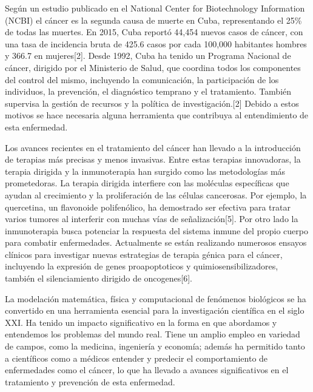\hspace{.1cm}Según un estudio publicado en el National Center for Biotechnology Information (NCBI) el cáncer es la segunda causa de muerte en Cuba, representando el 25\% de todas las muertes. En 2015, Cuba reportó 44,454 nuevos casos de cáncer, con una tasa de incidencia bruta de 425.6 casos por cada 100,000 habitantes hombres y 366.7 en mujeres[2]. Desde 1992, Cuba ha tenido un Programa Nacional de cáncer, dirigido por el Ministerio de Salud, que coordina todos los componentes del control del mismo, incluyendo la comunicación, la participación de los individuos, la prevención, el diagnóstico temprano y el tratamiento. También supervisa la gestión de recursos y la política de investigación.[2] Debido a estos motivos se hace necesaria alguna herramienta que contribuya al entendimiento de esta enfermedad.

\hspace{.1cm}Los avances recientes en el tratamiento del cáncer han llevado a la introducción de terapias más precisas y menos invasivas. Entre estas terapias innovadoras, la terapia dirigida y la inmunoterapia han surgido como las metodologías más prometedoras. La terapia dirigida interfiere con las moléculas específicas que ayudan al crecimiento y la proliferación de las células cancerosas. Por ejemplo, la quercetina, un flavonoide polifen\'olico, ha demostrado ser efectiva para tratar varios tumores al interferir con muchas vías de señalización[5]. Por otro lado la inmunoterapia busca potenciar la respuesta del sistema inmune del propio cuerpo para combatir enfermedades. Actualmente se están realizando numerosos ensayos clínicos para investigar nuevas estrategias de terapia génica para el cáncer, incluyendo la expresión de genes proapoptoticos y quimiosensibilizadores, también el silenciamiento dirigido de oncogenes[6].

\hspace{.1cm}La modelación matemática, física y computacional de fenómenos biológicos se ha convertido en una herramienta esencial para la investigación científica en el siglo XXI. Ha tenido un impacto significativo en la forma en que abordamos y entendemos los problemas del mundo real. Tiene un amplio empleo en variedad de campos, como la medicina, ingeniería y economía; además ha permitido tanto a científicos como a médicos entender y predecir el comportamiento de enfermedades como el cáncer, lo que ha llevado a avances significativos en el tratamiento y prevención de esta enfermedad.

